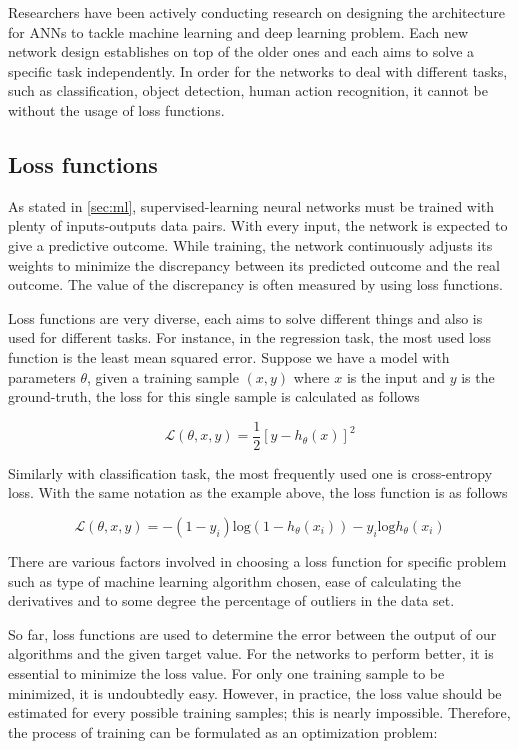 Researchers have been actively conducting research on designing the architecture for ANNs to tackle machine learning and deep learning problem. Each new network design establishes on top of the older ones and each aims to solve a specific task independently. In order for the networks to deal with different tasks, such as classification, object detection, human action recognition, it cannot be without the usage of loss functions.

\subsection{Loss functions}

As stated in \ref{sec:ml}, supervised-learning neural networks must be trained with plenty of inputs-outputs data pairs. With every input, the network is expected to give a predictive outcome. While training, the network continuously adjusts its weights to minimize the discrepancy between its predicted outcome and the real outcome. The value of the discrepancy is often measured by using loss functions.

Loss functions are very diverse, each aims to solve different things and also is used for different tasks. For instance, in the regression task, the most used loss function is the least mean squared error. Suppose we have a model with parameters $\theta$, given a training sample $(x,y)$ where $x$ is the input and $y$ is the ground-truth, the loss for this single sample is calculated as follows

\begin{equation}
    \mathcal{L}(\theta,x,y) = \frac{1}{2} [y - h_{\theta}(x)]^2
\end{equation}

Similarly with classification task, the most frequently used one is cross-entropy loss. With the same notation as the example above, the loss function is as follows

\begin{equation}
    \mathcal{L}(\theta,x,y) = - (1-y_i) \text{log}(1-h_\theta(x_i)) - y_i\text{log}h_\theta(x_i)
\end{equation}

There are various factors involved in choosing a loss function for specific problem such as type of machine learning algorithm chosen, ease of calculating the derivatives and to some degree the percentage of outliers in the data set. 

So far, loss functions are used to determine the error between the output of our algorithms and the given target value. For the networks to perform better, it is essential to minimize the loss value. For only one training sample to be minimized, it is undoubtedly easy.
However, in practice, the loss value should be estimated for every possible training samples; this is nearly impossible. Therefore, the process of training can be formulated as an optimization problem: 

